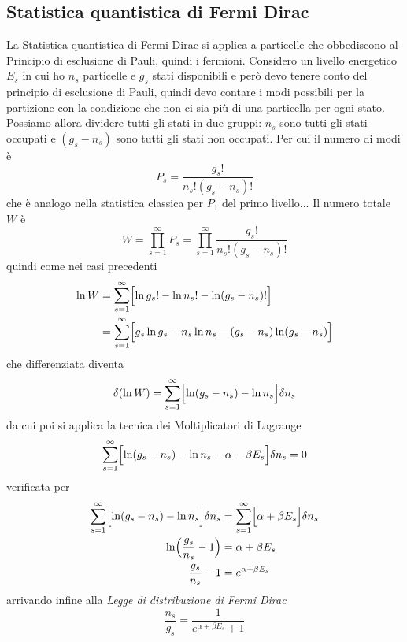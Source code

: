 \subsection{Statistica quantistica di Fermi Dirac}
La Statistica quantistica di Fermi Dirac si applica a particelle che obbediscono al Principio di esclusione di Pauli, quindi i fermioni.
Considero un livello energetico $E_s$ in cui ho $n_s$ particelle e $g_s$ stati disponibili e però devo tenere conto del principio di esclusione di Pauli, quindi devo contare i modi possibili per la partizione con la condizione che non ci sia più di una particella per ogni stato.
Possiamo allora dividere tutti gli stati in \underline{due gruppi}: $n_s$ sono tutti gli stati occupati e $(g_s - n_s)$ sono tutti gli stati non occupati.
Per cui il numero di modi è
\begin{equation}
P_s = \frac{ g_s !}{n_s! (g_s - n_s)! }
\end{equation}
che è analogo nella statistica classica per $P_1$ del primo livello...
Il numero totale $W$ è
\begin{equation}
W = \prod_{s=1}^{\infty} P_s = \prod_{s=1}^{\infty} \frac{ g_s !}{n_s! (g_s - n_s)! }
\end{equation}
quindi come nei casi precedenti
\begin{equation}
\begin{split}
\ln W & = \sum _{s=1}^{\infty} \Bigl[  \ln g_s! - \ln n_s! - \ln (g_s -n_s)!  \Bigr] \\
& = \sum _{s=1}^{\infty} \Bigl[   g_s \ln g_s - n_s \ln n_s  - (g_s - n_s) \ln (g_s - n_s)  \Bigr]
\end{split}
\end{equation}
che differenziata diventa
\begin{equation}
\delta (\ln W) = \sum _{s=1}^{\infty} \Bigl[ \ln (g_s - n_s) - \ln n_s \Bigr] \delta n_s
\end{equation}
da cui poi si applica la tecnica dei Moltiplicatori di Lagrange
\begin{equation}
\sum _{s=1}^{\infty} \Bigl[   \ln (g_s - n_s) - \ln n_s - \alpha - \beta E_s  \Bigr] \delta n_s = 0
\end{equation}
verificata per
\begin{equation}
\begin{split}
\sum _{s=1}^{\infty} \Bigl[   \ln (g_s - n_s) - \ln n_s \Bigr] \delta n_s &= \sum _{s=1}^{\infty} \Bigl[ \alpha + \beta E_s  \Bigr] \delta n_s \\
\ln \Bigl(  \frac{g_s }{n_s } - 1  \Bigr) & =  \alpha + \beta E_s \\
\frac{g_s }{n_s } - 1 & =  e^{ \alpha + \beta E_s  }
\end{split}
\end{equation}
arrivando infine alla \textit{Legge di distribuzione di Fermi Dirac}
\begin{equation}
\frac{ n_s}{g_s } = \frac{ 1}{e^{ \alpha + \beta E_s } + 1 }
\label{dist_FD}
\end{equation}


